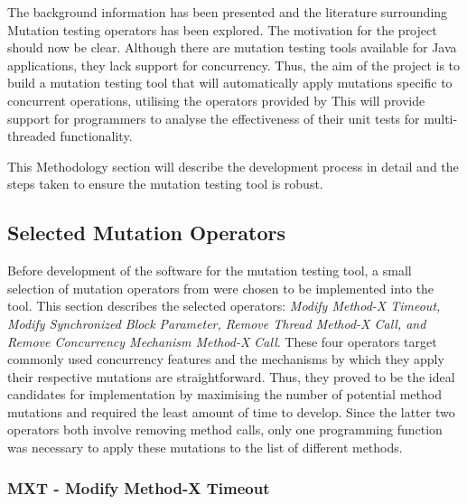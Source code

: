 \documentclass[a4paper,12pt]{article}
\begin{document}
The background information has been presented and the literature surrounding Mutation testing operators has been explored. The motivation for the project should now be clear. Although there are mutation testing tools available for Java applications, they lack support for concurrency. Thus, the aim of the project is to build a mutation testing tool that will automatically apply mutations specific to concurrent operations, utilising the operators provided by \citeauthor{bradbury06} This will provide support for programmers to analyse the effectiveness of their unit tests for multi-threaded functionality.

This Methodology section will describe the development process in detail and the steps taken to ensure the mutation testing tool is robust.   


\subsection{Selected Mutation Operators}

Before development of the software for the mutation testing tool, a small selection of mutation operators from \citeauthor{bradbury06} were chosen to be implemented into the tool. This section describes the selected operators: \textit{Modify Method-X Timeout, Modify Synchronized Block Parameter, Remove Thread Method-X Call, and Remove Concurrency Mechanism Method-X Call}. These four operators target commonly used concurrency features and the mechanisms by which they apply their respective mutations are straightforward. Thus, they proved to be the ideal candidates for implementation by maximising the number of potential method mutations and required the least amount of time to develop. Since the latter two operators both involve removing method calls, only one programming function was necessary to apply these mutations to the list of different methods.    

\subsubsection{MXT - Modify Method-X Timeout}
\end{document}
